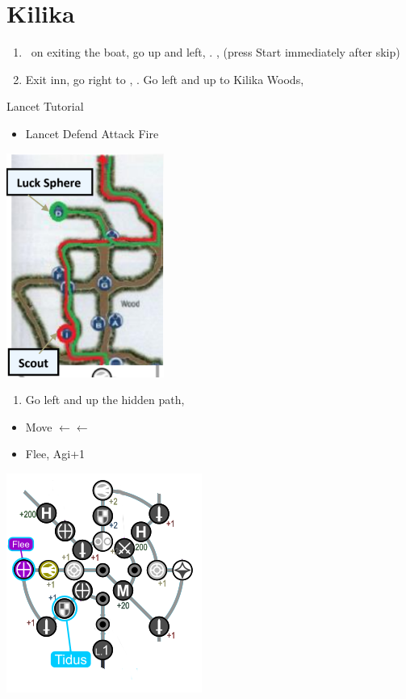 \chapter{Kilika}

\begin{enumerate}
  \item \sd\ on exiting the boat, go up and left, \sd. \skippablefmv[2:00], (press Start immediately after skip) \sd
  \item Exit inn, go right to \wakka, \sd. Go left and up to Kilika Woods, \sd
\end{enumerate}
\begin{battle}{Lancet Tutorial}
  \begin{itemize}
    \item \sd
    \kimahrif Lancet
          \switch{\kimahri}{\yuna}
          \yunaf Defend
          \tidusf Attack
          \luluf Fire
  \end{itemize}
\end{battle}
\includegraphics{graphics/kilikamap}
\begin{enumerate}[resume]
  \item Go left and up the hidden path, 
\end{enumerate}
\begin{spheregrid}
  \begin{itemize}
    \tidusf
    \begin{itemize}
    \item Move $\leftarrow\leftarrow$
    \item Flee, Agi+1
    \end{itemize}
  \end{itemize}
  \includegraphics{graphics/Tidus_Kilika}
\end{spheregrid}
